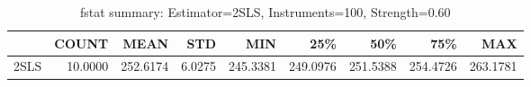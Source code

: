 \begin{table}[ht]
\centering
\caption{fstat summary: Estimator=2SLS, Instruments=100, Strength=0.60}
\begin{tabular}{lrrrrrrrr}
\toprule
 & COUNT & MEAN & STD & MIN & 25\% & 50\% & 75\% & MAX \\
\midrule
2SLS & 10.0000 & 252.6174 & 6.0275 & 245.3381 & 249.0976 & 251.5388 & 254.4726 & 263.1781 \\
\bottomrule
\end{tabular}
\end{table}
